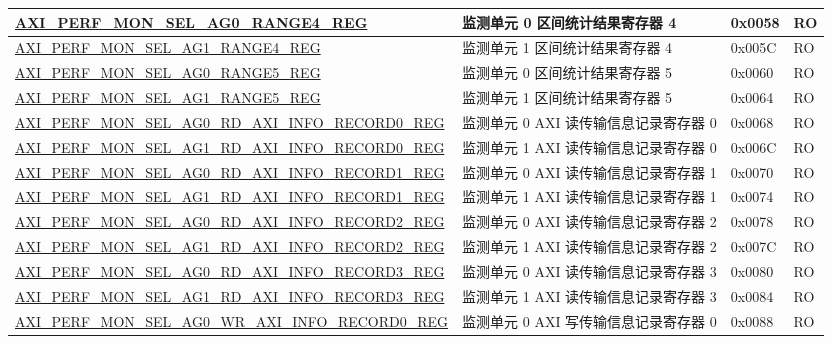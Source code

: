 \begin{longtable}{ | p{9.1cm} | p{5cm} | p{1.3cm} | p{1.3cm} | }
\hyperref[regdesc:AXIPERFMONSELAGNRANGEMREG]{AXI\_PERF\_MON\_SEL\_AG0\_RANGE4\_REG} & 监测单元 0 区间统计结果寄存器 4 & 0x0058 & RO\\ \hline
\hyperref[regdesc:AXIPERFMONSELAGNRANGEMREG]{AXI\_PERF\_MON\_SEL\_AG1\_RANGE4\_REG} & 监测单元 1 区间统计结果寄存器 4 & 0x005C & RO\\ \hline
\hyperref[regdesc:AXIPERFMONSELAGNRANGEMREG]{AXI\_PERF\_MON\_SEL\_AG0\_RANGE5\_REG} & 监测单元 0 区间统计结果寄存器 5 & 0x0060 & RO\\ \hline
\hyperref[regdesc:AXIPERFMONSELAGNRANGEMREG]{AXI\_PERF\_MON\_SEL\_AG1\_RANGE5\_REG} & 监测单元 1 区间统计结果寄存器 5 & 0x0064 & RO\\ \hline
\hyperref[regdesc:AXIPERFMONSELAGNRDAXIINFORECORDMREG]{AXI\_PERF\_MON\_SEL\_AG0\_RD\_AXI\_INFO\_RECORD0\_REG} & 监测单元 0 AXI 读传输信息记录寄存器 0 & 0x0068 & RO\\ \hline
\hyperref[regdesc:AXIPERFMONSELAGNRDAXIINFORECORDMREG]{AXI\_PERF\_MON\_SEL\_AG1\_RD\_AXI\_INFO\_RECORD0\_REG} & 监测单元 1 AXI 读传输信息记录寄存器 0 & 0x006C & RO\\ \hline
\hyperref[regdesc:AXIPERFMONSELAGNRDAXIINFORECORDMREG]{AXI\_PERF\_MON\_SEL\_AG0\_RD\_AXI\_INFO\_RECORD1\_REG} & 监测单元 0 AXI 读传输信息记录寄存器 1 & 0x0070 & RO\\ \hline
\hyperref[regdesc:AXIPERFMONSELAGNRDAXIINFORECORDMREG]{AXI\_PERF\_MON\_SEL\_AG1\_RD\_AXI\_INFO\_RECORD1\_REG} & 监测单元 1 AXI 读传输信息记录寄存器 1 & 0x0074 & RO\\ \hline
\hyperref[regdesc:AXIPERFMONSELAGNRDAXIINFORECORDMREG]{AXI\_PERF\_MON\_SEL\_AG0\_RD\_AXI\_INFO\_RECORD2\_REG} & 监测单元 0 AXI 读传输信息记录寄存器 2 & 0x0078 & RO\\ \hline
\hyperref[regdesc:AXIPERFMONSELAGNRDAXIINFORECORDMREG]{AXI\_PERF\_MON\_SEL\_AG1\_RD\_AXI\_INFO\_RECORD2\_REG} & 监测单元 1 AXI 读传输信息记录寄存器 2 & 0x007C & RO\\ \hline
\hyperref[regdesc:AXIPERFMONSELAGNRDAXIINFORECORDMREG]{AXI\_PERF\_MON\_SEL\_AG0\_RD\_AXI\_INFO\_RECORD3\_REG} & 监测单元 0 AXI 读传输信息记录寄存器 3 & 0x0080 & RO\\ \hline
\hyperref[regdesc:AXIPERFMONSELAGNRDAXIINFORECORDMREG]{AXI\_PERF\_MON\_SEL\_AG1\_RD\_AXI\_INFO\_RECORD3\_REG} & 监测单元 1 AXI 读传输信息记录寄存器 3 & 0x0084 & RO\\ \hline
\hyperref[regdesc:AXIPERFMONSELAGNWRAXIINFORECORDMREG]{AXI\_PERF\_MON\_SEL\_AG0\_WR\_AXI\_INFO\_RECORD0\_REG} & 监测单元 0 AXI 写传输信息记录寄存器 0 & 0x0088 & RO\\ \hline

\end{longtable}
